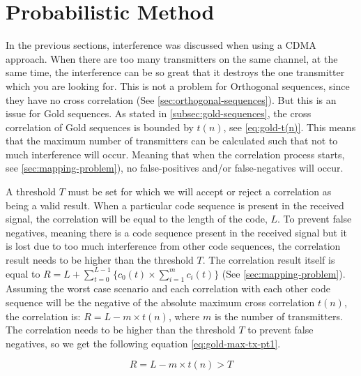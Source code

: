
\section{Probabilistic Method}
\label{sec:probabilistic-method}

In the previous sections, interference was discussed when using a CDMA approach.
When there are too many transmitters on the same channel, at the same time, the interference can be so great that it destroys the one transmitter which you are looking for.
This is not a problem for Orthogonal sequences, since they have no cross correlation (See \autoref{sec:orthogonal-sequences}).
But this is an issue for Gold sequences. 
As stated in \autoref{subsec:gold-sequences}, the cross correlation of Gold sequences is bounded by $t(n)$, see \autoref{eq:gold-t(n)}.
This means that the maximum number of transmitters can be calculated such that not to much interference will occur. 
Meaning that when the correlation process starts, see \autoref{sec:mapping-problem}), no false-positives and/or false-negatives will occur.


A threshold $T$ must be set for which we will accept or reject a correlation as being a valid result.
When a particular code sequence is present in the received signal, the correlation will be equal to the length of the code, $L$.
To prevent false negatives, meaning there is a code sequence present in the received signal but it is lost due to too much interference from other code sequences, the correlation result needs to be higher than the threshold $T$.
The correlation result itself is equal to $R = L + \displaystyle\sum_{t = 0} ^ {L - 1} \Bigg\{ c_0(t) \times  \displaystyle\sum_{i = 1} ^ {m} c_i(t) \Bigg\} $ (See \autoref{sec:mapping-problem}).
Assuming the worst case scenario and each correlation with each other code sequence will be the negative of the absolute maximum cross correlation $t(n)$, the correlation is: $R = L - m \times t(n)$, where $m$ is the number of transmitters.
The correlation needs to be higher than the threshold $T$ to prevent false negatives, so we get the following equation \autoref{eq:gold-max-tx-pt1}.

\begin{equation}
	\label{eq:gold-max-tx-pt1}
	R = L - m \times t(n) > T
\end{equation}

